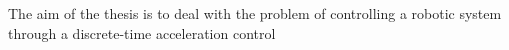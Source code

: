 
    The aim of the thesis is to deal with the problem of controlling a robotic system through a discrete-time acceleration control
